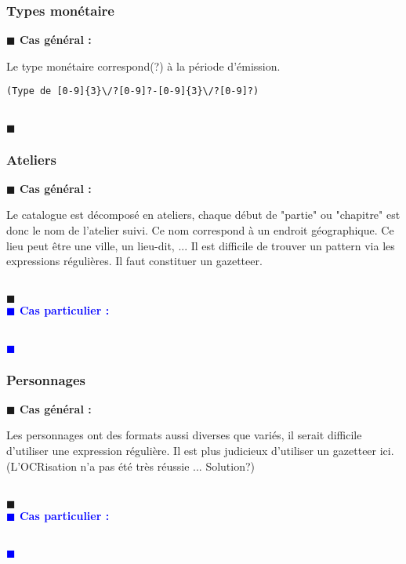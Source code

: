 \documentclass[a4paper, 11pt]{article}
\newenvironment{general}
    {
    \noindent\textbf{\textcolor{dark-blue}{$\blacksquare$  Cas général : \\}}
    }
    {
    ~\\\noindent\textcolor{dark-blue}{$\blacksquare$}\\
    }
\newenvironment{particulier}
    {
    \noindent\textbf{\textcolor{blue}{$\blacksquare$  Cas particulier : \\}}
    }
    {
    \\\noindent\textcolor{blue}{$\blacksquare$}\\
    }
\begin{document}
\subsubsection{Types monétaire}
\begin{general}
Le type monétaire correspond(?) à la période d'émission.
\begin{verbatim}
(Type de [0-9]{3}\/?[0-9]?-[0-9]{3}\/?[0-9]?)
\end{verbatim}
\end{general}

\subsubsection{Ateliers}
\begin{general}
Le catalogue est décomposé en ateliers, chaque début de "partie" ou "chapitre" est donc le nom de l'atelier suivi. Ce nom correspond à un endroit géographique. Ce lieu peut être une ville, un lieu-dit, ... Il est difficile de trouver un pattern via les expressions régulières. Il faut constituer un gazetteer.
\end{general}
\begin{particulier}
\end{particulier}

\subsubsection{Personnages}
\begin{general}
Les personnages ont des formats aussi diverses que variés, il serait difficile d'utiliser une expression régulière. Il est plus judicieux d'utiliser un gazetteer ici. (L'OCRisation n'a pas été très réussie ... Solution?)
\end{general}
\begin{particulier}
\end{particulier}
\end{document}
